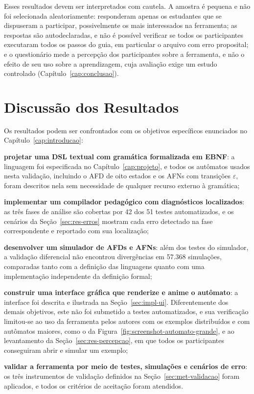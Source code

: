 \documentclass[
    12pt
    ,oneside
    ,a4paper
    ,chapter=TITLE
    ,section=TITLE
    ,sumario=abnt-6027-2012]{abntex2}
\begin{document}
Esses resultados devem ser interpretados com cautela. A amostra é pequena e não foi
selecionada aleatoriamente: responderam apenas os estudantes que se dispuseram a participar,
possivelmente os mais interessados na ferramenta; as
respostas são autodeclaradas, e não é possível verificar se todos os participantes executaram
todos os passos do guia, em particular o arquivo com erro proposital; e o questionário mede a
percepção dos participantes sobre a ferramenta, e não o efeito de seu uso sobre a
aprendizagem, cuja avaliação exige um estudo controlado (Capítulo~\ref{cap:conclusao}).

\section{Discussão dos Resultados}
\label{sec:res-discussao}

Os resultados podem ser confrontados com os objetivos específicos enunciados no
Capítulo~\ref{cap:introducao}:

\begin{alineas}
    \item \textbf{projetar uma DSL textual com gramática formalizada em EBNF}: a linguagem
    foi especificada no Capítulo~\ref{cap:projeto}, e todos os autômatos usados nesta
    validação, incluindo o AFD de oito estados e os AFNs com transições $\varepsilon$, foram
    descritos nela sem necessidade de qualquer recurso externo à gramática;
    \item \textbf{implementar um compilador pedagógico com diagnósticos localizados}: as três
    fases de análise são cobertas por 42 dos 51 testes automatizados, e os cenários da
    Seção~\ref{sec:res-erros} mostram cada erro detectado na fase correspondente e reportado
    com sua localização;
    \item \textbf{desenvolver um simulador de AFDs e AFNs}: além dos testes do simulador, a
    validação diferencial não encontrou divergências em 57.368 simulações, comparadas tanto
    com a definição das linguagens quanto com uma implementação independente da definição
    formal;
    \item \textbf{construir uma interface gráfica que renderize e anime o autômato}: a
    interface foi descrita e ilustrada na Seção~\ref{sec:impl-ui}. Diferentemente dos demais
    objetivos, este não foi submetido a testes automatizados, e sua verificação limitou-se ao
    uso da ferramenta pelos autores com os exemplos distribuídos e com autômatos maiores, como
    o da Figura~\ref{fig:screenshot-automato-grande}, e ao levantamento da
    Seção~\ref{sec:res-percepcao}, em que todos os participantes conseguiram abrir e simular um
    exemplo;
    \item \textbf{validar a ferramenta por meio de testes, simulações e cenários de erro}: os
    três instrumentos de validação definidos na Seção~\ref{sec:met-validacao} foram aplicados, e todos os
    critérios de aceitação foram atendidos.
\end{alineas}
\end{document}
